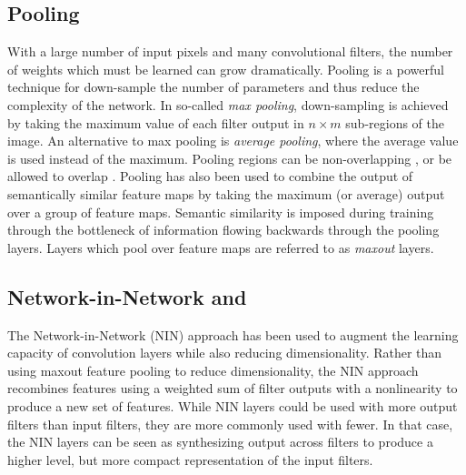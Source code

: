 \subsection{Pooling}

With a large number of input pixels and many convolutional filters, the number of weights which must be learned can grow dramatically.
Pooling \cite{lecun2010convolutional} is a powerful technique for down-sample the number of parameters and thus reduce the complexity of the network.
In so-called \textit{max pooling}, down-sampling is achieved by taking the maximum value of each filter output in $n \times m$ sub-regions of the image.
An alternative to max pooling is \textit{average pooling}, where the average value is used instead of the maximum.  Pooling regions can be non-overlapping \cite{lecun2010convolutional}, or be allowed  to overlap \cite{szegedy2014going,krizhevsky2012imagenet}.
Pooling has also been used to combine the output of semantically similar feature maps by taking the maximum (or average) output over a group of feature maps\cite{lecun2015deep}.
Semantic similarity is imposed during training through the bottleneck of information flowing backwards through the pooling layers.  Layers which pool over feature maps are referred to as \textit{maxout} layers.

\subsection{Network-in-Network and \googlenet}

The Network-in-Network (NIN) \cite{lin2013network} approach has been used to augment the learning capacity of convolution layers while also reducing dimensionality.
Rather than using maxout feature pooling to reduce dimensionality, the NIN approach recombines features using a weighted sum of filter outputs with a \relu nonlinearity to produce a new set of features.
While NIN layers could be used with more output filters than input filters, they are more commonly used with fewer.
In that case, the NIN layers can be seen as synthesizing output across filters to produce a higher level, but more compact representation of the input filters.

